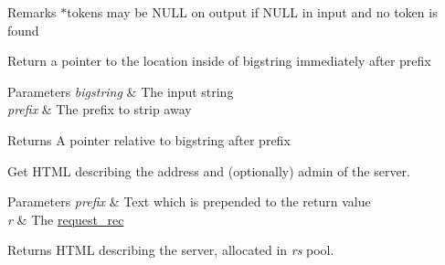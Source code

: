 \begin{DoxyRemark}{Remarks}
$\ast$tokens may be N\+U\+LL on output if N\+U\+LL in input and no token is found
\end{DoxyRemark}
Return a pointer to the location inside of bigstring immediately after prefix 
\begin{DoxyParams}{Parameters}
{\em bigstring} & The input string \\
\hline
{\em prefix} & The prefix to strip away \\
\hline
\end{DoxyParams}
\begin{DoxyReturn}{Returns}
A pointer relative to bigstring after prefix
\end{DoxyReturn}
Get H\+T\+ML describing the address and (optionally) admin of the server. 
\begin{DoxyParams}{Parameters}
{\em prefix} & Text which is prepended to the return value \\
\hline
{\em r} & The \hyperlink{structrequest__rec}{request\+\_\+rec} \\
\hline
\end{DoxyParams}
\begin{DoxyReturn}{Returns}
H\+T\+ML describing the server, allocated in {\itshape r\textquotesingle{}s} pool. 
\end{DoxyReturn}
